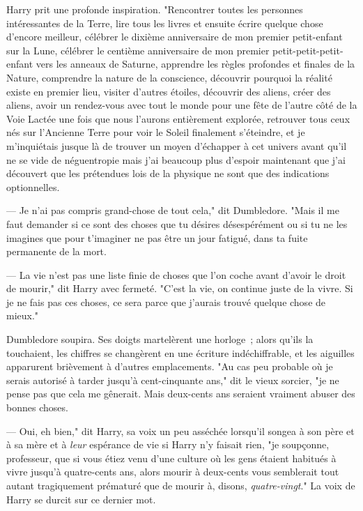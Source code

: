 Harry prit une profonde inspiration. "Rencontrer toutes les personnes intéressantes de la Terre, lire tous les livres et ensuite écrire quelque chose d'encore meilleur, célébrer le dixième anniversaire de mon premier petit-enfant sur la Lune, célébrer le centième anniversaire de mon premier petit-petit-petit-enfant vers les anneaux de Saturne, apprendre les règles profondes et finales de la Nature, comprendre la nature de la conscience, découvrir pourquoi la réalité existe en premier lieu, visiter d'autres étoiles, découvrir des aliens, créer des aliens, avoir un rendez-vous avec tout le monde pour une fête de l'autre côté de la Voie Lactée une fois que nous l'aurons entièrement explorée, retrouver tous ceux nés sur l'Ancienne Terre pour voir le Soleil finalement s'éteindre, et je m'inquiétais jusque là de trouver un moyen d'échapper à cet univers avant qu'il ne se vide de néguentropie mais j'ai beaucoup plus d'espoir maintenant que j'ai découvert que les prétendues lois de la physique ne sont que des indications optionnelles.

--- Je n'ai pas compris grand-chose de tout cela," dit Dumbledore. "Mais il me faut demander si ce sont des choses que tu désires désespérément ou si tu ne les imagines que pour t'imaginer ne pas être un jour fatigué, dans ta fuite permanente de la mort.

--- La vie n'est pas une liste finie de choses que l'on coche avant d'avoir le droit de mourir," dit Harry avec fermeté. "C'est la vie, on continue juste de la vivre. Si je ne fais pas ces choses, ce sera parce que j'aurais trouvé quelque chose de mieux."

Dumbledore soupira. Ses doigts martelèrent une horloge~; alors qu'ils la touchaient, les chiffres se changèrent en une écriture indéchiffrable, et les aiguilles apparurent brièvement à d'autres emplacements. "Au cas peu probable où je serais autorisé à tarder jusqu'à cent-cinquante ans," dit le vieux sorcier, "je ne pense pas que cela me gênerait. Mais deux-cents ans seraient vraiment abuser des bonnes choses.

--- Oui, eh bien," dit Harry, sa voix un peu asséchée lorsqu'il songea à son père et à sa mère et à \emph{leur} espérance de vie si Harry n'y faisait rien, "je soupçonne, professeur, que si vous étiez venu d'une culture où les gens étaient habitués à vivre jusqu'à quatre-cents ans, alors mourir à deux-cents vous semblerait tout autant tragiquement prématuré que de mourir à, disons, \emph{quatre-vingt}." La voix de Harry se durcit sur ce dernier mot.

